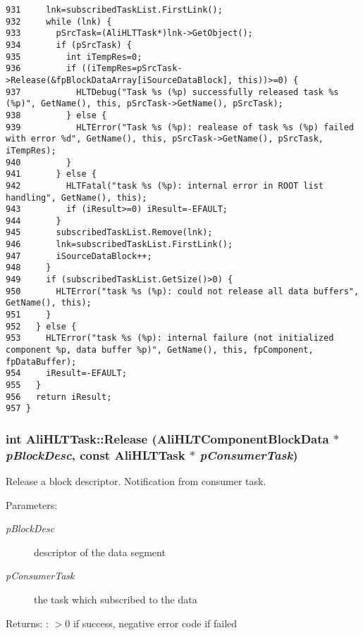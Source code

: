 \begin{verbatim}
931     lnk=subscribedTaskList.FirstLink();
932     while (lnk) {
933       pSrcTask=(AliHLTTask*)lnk->GetObject();
934       if (pSrcTask) {
935         int iTempRes=0;
936         if ((iTempRes=pSrcTask->Release(&fpBlockDataArray[iSourceDataBlock], this))>=0) {
937           HLTDebug("Task %s (%p) successfully released task %s (%p)", GetName(), this, pSrcTask->GetName(), pSrcTask);
938         } else {
939           HLTError("Task %s (%p): realease of task %s (%p) failed with error %d", GetName(), this, pSrcTask->GetName(), pSrcTask, iTempRes);
940         }
941       } else {
942         HLTFatal("task %s (%p): internal error in ROOT list handling", GetName(), this);
943         if (iResult>=0) iResult=-EFAULT;
944       }
945       subscribedTaskList.Remove(lnk);
946       lnk=subscribedTaskList.FirstLink();
947       iSourceDataBlock++;
948     }
949     if (subscribedTaskList.GetSize()>0) {
950       HLTError("task %s (%p): could not release all data buffers", GetName(), this);
951     }
952   } else {
953     HLTError("task %s (%p): internal failure (not initialized component %p, data buffer %p)", GetName(), this, fpComponent, fpDataBuffer);
954     iResult=-EFAULT;
955   }
956   return iResult;
957 }
\end{verbatim}\normalsize 


\subsubsection{\setlength{\rightskip}{0pt plus 5cm}int Ali\-HLTTask::Release ({\bf Ali\-HLTComponent\-Block\-Data} $\ast$ {\em p\-Block\-Desc}, const {\bf Ali\-HLTTask} $\ast$ {\em p\-Consumer\-Task})}\label{classAliHLTTask_a24}


Release a block descriptor. Notification from consumer task. \begin{Desc}
\item[Parameters:]
\begin{description}
\item[{\em p\-Block\-Desc}]descriptor of the data segment \item[{\em p\-Consumer\-Task}]the task which subscribed to the data \end{description}
\end{Desc}
\begin{Desc}
\item[Returns:]: $>$0 if success, negative error code if failed \end{Desc}


